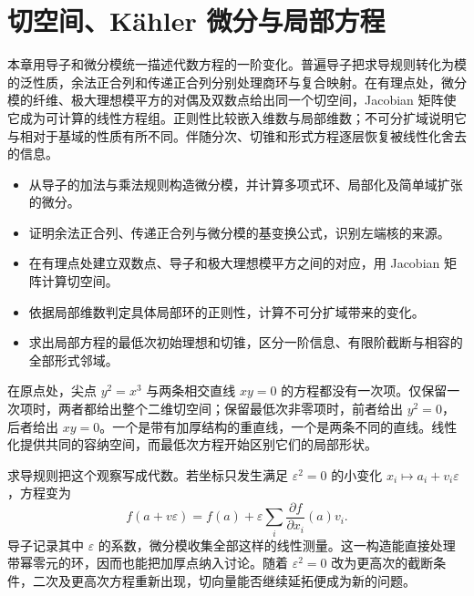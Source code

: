
% 
% 

\chapter{切空间、Kähler 微分与局部方程}
\label{g5:ch:05}

\begin{chapterabstract}
	本章用导子和微分模统一描述代数方程的一阶变化。普遍导子把求导规则转化为模的泛性质，余法正合列和传递正合列分别处理商环与复合映射。在有理点处，微分模的纤维、极大理想模平方的对偶及双数点给出同一个切空间，Jacobian 矩阵使它成为可计算的线性方程组。正则性比较嵌入维数与局部维数；不可分扩域说明它与相对于基域的性质有所不同。伴随分次、切锥和形式方程逐层恢复被线性化舍去的信息。
\end{chapterabstract}

\begin{learninggoals}
	\begin{itemize}
		\item 从导子的加法与乘法规则构造微分模，并计算多项式环、局部化及简单域扩张的微分。
		\item 证明余法正合列、传递正合列与微分模的基变换公式，识别左端核的来源。
		\item 在有理点处建立双数点、导子和极大理想模平方之间的对应，用 Jacobian 矩阵计算切空间。
		\item 依据局部维数判定具体局部环的正则性，计算不可分扩域带来的变化。
		\item 求出局部方程的最低次初始理想和切锥，区分一阶信息、有限阶截断与相容的全部形式邻域。
	\end{itemize}
\end{learninggoals}

在原点处，尖点 \(y^2=x^3\) 与两条相交直线 \(xy=0\) 的方程都没有一次项。仅保留一次项时，两者都给出整个二维切空间；保留最低次非零项时，前者给出 \(y^2=0\)，后者给出 \(xy=0\)。一个是带有加厚结构的重直线，一个是两条不同的直线。线性化提供共同的容纳空间，而最低次方程开始区别它们的局部形状。

\ProseParagraphBreak

求导规则把这个观察写成代数。若坐标只发生满足 \(\varepsilon^2=0\) 的小变化 \(x_i\mapsto a_i+v_i\varepsilon\)，方程变为
\[
	f(a+v\varepsilon)
	=f(a)+\varepsilon\sum_i\frac{\partial f}{\partial x_i}(a)v_i.
\]
导子记录其中 \(\varepsilon\) 的系数，微分模收集全部这样的线性测量。这一构造能直接处理带幂零元的环，因而也能把加厚点纳入讨论。随着 \(\varepsilon^2=0\) 改为更高次的截断条件，二次及更高次方程重新出现，切向量能否继续延拓便成为新的问题。

